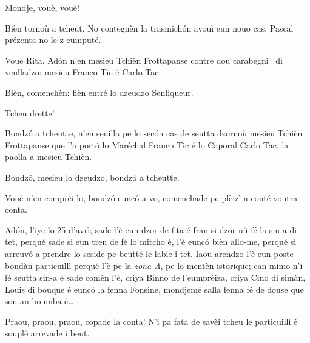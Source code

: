 \begin{drama}

 
\Ritaspeaks Mondje, vouè, vouè!


\Ritaspeaks Bièn tornoù a tcheut. No contegnèn la trasmichón avouì eun nouo cas. Pascal prézenta-no le-z-eumputé.

\Pascalspeaks Vouè Rita. Adón n'en mesieu Tchièn Frottapanse contre dou carabegnì \carabiniere\ di veulladzo: mesieu Franco Tic é Carlo Tac.


\Ritaspeaks Bièn, comenchèn: fièn entré lo dzeudzo Senliqueur.


\Pascalspeaks Tcheu drette!


\DzeudzoSenliquerspeaks Bondzó a tcheutte, n'en seuilla pe lo secón cas de seutta dzornoù mesieu Tchièn Frottapanse que l'a portó lo Maréchal Franco Tic é lo Caporal Carlo Tac, la paolla a mesieu Tchièn.

\Cienspeaks Bondzó, mesieu lo dzeudzo, bondzó a tcheutte.

\DzeudzoSenliquerspeaks Voué n’en comprèi-lo, bondzó eunc\'o a vo, comenchade pe plèizì a conté voutra conta.

\Cienspeaks Adón, l'iye lo 25 d’avrì; sade l'è eun dzor de fita é fran si dzor n’i fé la sin-a di tet, perqué sade si eun tren de fé lo mitcho é, l’è euncó bièn allo-me, perqué si arreuv\'o a prendre lo seside pe beutté le labie i tet. Iaou arendzo l’è eun poste bondàn particuillì perqué l’è pe la \textit{zona A}, pe lo mentèn istorique; can mimo n’i fé seutta sin-a é sade comèn l’è, criya Binno de l'eumprèiza, criya Cino di simàn, Louis di bouque é euncó la fenna Fonsine, mondjemé salla fenna fé de douse que son an boumba é\ldots

\DzeudzoSenliquerspeaks {} Praou, praou, praou, copade la conta! N’i pa fata de savèi tcheu le particuillì é souplé arrevade i beut.


\end{drama}
